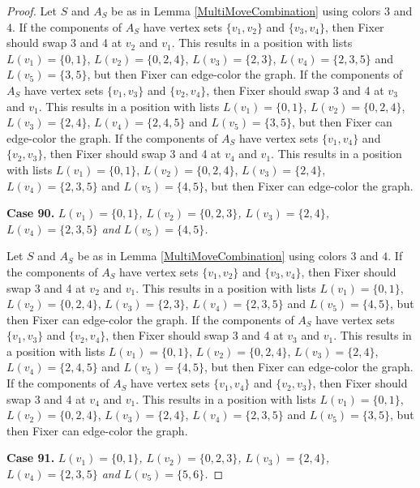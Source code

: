 \documentclass[12pt]{amsart}
\theoremstyle{plain}
\theoremstyle{definition}
\theoremstyle{remark}
\begin{document}
\begin{proof}
Let $S$ and $A_S$ be as in Lemma \ref{MultiMoveCombination} using colors $3$ and $4$. If the components of $A_S$ have vertex sets $\{v_1, v_2\}$ and $\{v_3, v_4\}$, then Fixer should swap 3 and 4 at $v_2$ and $v_1$. This results in a position with lists $L(v_1) = \{0, 1\}$, $L(v_2) = \{0, 2, 4\}$, $L(v_3) = \{2, 3\}$, $L(v_4) = \{2, 3, 5\}$ and $L(v_5) = \{3, 5\}$, but then Fixer can edge-color the graph.
If the components of $A_S$ have vertex sets $\{v_1, v_3\}$ and $\{v_2, v_4\}$, then Fixer should swap 3 and 4 at $v_3$ and $v_1$. This results in a position with lists $L(v_1) = \{0, 1\}$, $L(v_2) = \{0, 2, 4\}$, $L(v_3) = \{2, 4\}$, $L(v_4) = \{2, 4, 5\}$ and $L(v_5) = \{3, 5\}$, but then Fixer can edge-color the graph.
If the components of $A_S$ have vertex sets $\{v_1, v_4\}$ and $\{v_2, v_3\}$, then Fixer should swap 3 and 4 at $v_4$ and $v_1$. This results in a position with lists $L(v_1) = \{0, 1\}$, $L(v_2) = \{0, 2, 4\}$, $L(v_3) = \{2, 4\}$, $L(v_4) = \{2, 3, 5\}$ and $L(v_5) = \{4, 5\}$, but then Fixer can edge-color the graph.

\noindent\textbf{Case 90.  }\textit{$L(v_1) = \{0, 1\}$, $L(v_2) = \{0, 2, 3\}$, $L(v_3) = \{2, 4\}$, $L(v_4) = \{2, 3, 5\}$ and $L(v_5) = \{4, 5\}$.}

Let $S$ and $A_S$ be as in Lemma \ref{MultiMoveCombination} using colors $3$ and $4$. If the components of $A_S$ have vertex sets $\{v_1, v_2\}$ and $\{v_3, v_4\}$, then Fixer should swap 3 and 4 at $v_2$ and $v_1$. This results in a position with lists $L(v_1) = \{0, 1\}$, $L(v_2) = \{0, 2, 4\}$, $L(v_3) = \{2, 3\}$, $L(v_4) = \{2, 3, 5\}$ and $L(v_5) = \{4, 5\}$, but then Fixer can edge-color the graph.
If the components of $A_S$ have vertex sets $\{v_1, v_3\}$ and $\{v_2, v_4\}$, then Fixer should swap 3 and 4 at $v_3$ and $v_1$. This results in a position with lists $L(v_1) = \{0, 1\}$, $L(v_2) = \{0, 2, 4\}$, $L(v_3) = \{2, 4\}$, $L(v_4) = \{2, 4, 5\}$ and $L(v_5) = \{4, 5\}$, but then Fixer can edge-color the graph.
If the components of $A_S$ have vertex sets $\{v_1, v_4\}$ and $\{v_2, v_3\}$, then Fixer should swap 3 and 4 at $v_4$ and $v_1$. This results in a position with lists $L(v_1) = \{0, 1\}$, $L(v_2) = \{0, 2, 4\}$, $L(v_3) = \{2, 4\}$, $L(v_4) = \{2, 3, 5\}$ and $L(v_5) = \{3, 5\}$, but then Fixer can edge-color the graph.

\noindent\textbf{Case 91.  }\textit{$L(v_1) = \{0, 1\}$, $L(v_2) = \{0, 2, 3\}$, $L(v_3) = \{2, 4\}$, $L(v_4) = \{2, 3, 5\}$ and $L(v_5) = \{5, 6\}$.}


\end{proof}
\end{document}
